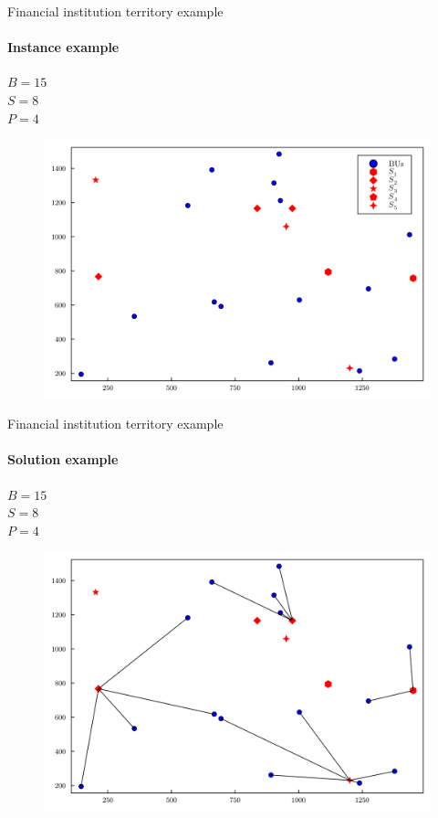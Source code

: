 \documentclass{beamer}
\begin{document}
\begin{frame}{Financial institution territory example}
    \framesubtitle{Instance example}
    $B = 15$ \\
    $S = 8$ \\
    $P = 4$ \\
    \begin{figure}
        \centering
        \includegraphics[scale=0.082]{plot_instance.png}
        \label{fig:instancia}
    \end{figure}
\end{frame}

\begin{frame}{Financial institution territory example}
    \framesubtitle{Solution example}
    $B = 15$ \\
    $S = 8$ \\
    $P = 4$ \\
    \begin{figure}
        \centering
        \includegraphics[scale=0.082]{solution_example.png}
        \label{fig:solucion}
    \end{figure}
\end{frame}
\end{document}
